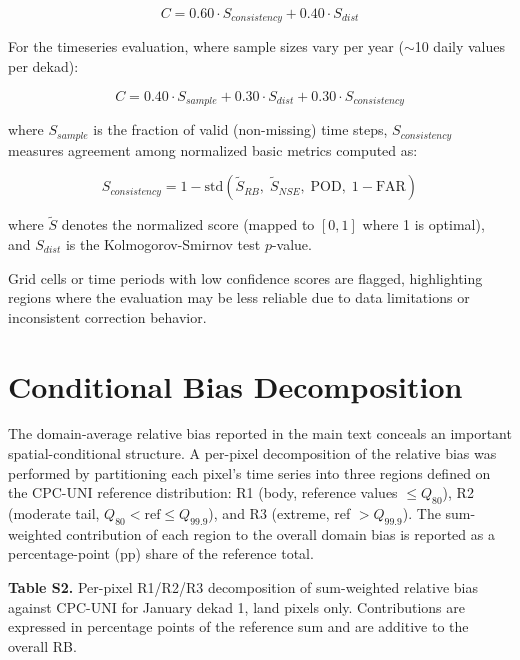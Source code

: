 \documentclass[11pt,a4paper]{article}
\begin{document}
\begin{equation}C = 0.60 \cdot S_{consistency} + 0.40 \cdot S_{dist}\end{equation}

For the timeseries evaluation, where sample sizes vary per year ($\sim$10 daily values per dekad):

\begin{equation}C = 0.40 \cdot S_{sample} + 0.30 \cdot S_{dist} + 0.30 \cdot S_{consistency}\end{equation}

where $S_{sample}$ is the fraction of valid (non-missing) time steps, $S_{consistency}$ measures agreement among normalized basic metrics computed as:

\begin{equation}S_{consistency} = 1 - \text{std}\left(\tilde{S}_{RB}, \; \tilde{S}_{NSE}, \; \text{POD}, \; 1 - \text{FAR}\right)\end{equation}

where $\tilde{S}$ denotes the normalized score (mapped to $[0, 1]$ where 1 is optimal), and $S_{dist}$ is the Kolmogorov-Smirnov test $p$-value.

Grid cells or time periods with low confidence scores are flagged, highlighting regions where the evaluation may be less reliable due to data limitations or inconsistent correction behavior.

\section{Conditional Bias Decomposition}\label{sec:s4}

The domain-average relative bias reported in the main text conceals an important spatial-conditional structure. A per-pixel decomposition of the relative bias was performed by partitioning each pixel's time series into three regions defined on the CPC-UNI reference distribution: R1 (body, reference values $\leq Q_{80}$), R2 (moderate tail, $Q_{80} < \text{ref} \leq Q_{99.9}$), and R3 (extreme, ref $> Q_{99.9}$). The sum-weighted contribution of each region to the overall domain bias is reported as a percentage-point (pp) share of the reference total.

\textbf{Table S2.} Per-pixel R1/R2/R3 decomposition of sum-weighted relative bias against CPC-UNI for January dekad 1, land pixels only. Contributions are expressed in percentage points of the reference sum and are additive to the overall RB.
\end{document}
